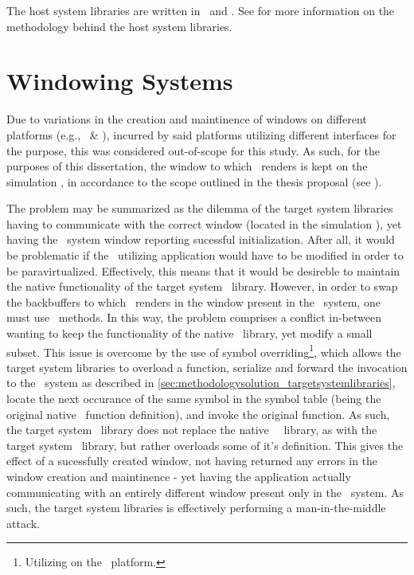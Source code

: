 The host system libraries are written in \dvttermc\ and \dvttermcplusplus .
See  for more information on the methodology behind the host system libraries.

\section{Windowing Systems}
\label{sec:methodologysolution_windowingsystems}
Due to variations in the creation and maintinence of windows on different platforms (e.g., \dvttermfedora\ \& \dvttermandroid ), incurred by said platforms utilizing different interfaces for the purpose, this was considered out-of-scope for this study.
As such, for the purposes of this dissertation, the window to which \dvttermopengl\ renders is kept on the simulation \dvttermhost , in accordance to the scope outlined in the thesis proposal (see ).

The problem may be summarized as the dilemma of the target system libraries having to communicate with the correct window (located in the simulation \dvttermhost ), yet having the \dvttermtarget\ system window reporting sucessful initialization.
After all, it would be problematic if the \dvttermopengl\ utilizing application would have to be modified in order to be paravirtualized.
Effectively, this means that it would be desireble to maintain the native functionality of the target system \dvttermegl\ library.
However, in order to swap the backbuffers to which \dvttermopengl\ renders in the window present in the \dvttermhost\ system, one must use \dvttermegl\ methods.
In this way, the problem comprises a conflict in-between wanting to keep the functionality of the native \dvttermegl\ library, yet modify a small subset. 
This issue is overcome by the use of symbol overriding\footnote{Utilizing  on the \dvttermlinux\ platform.}, which allows the target system libraries to overload a function, serialize and forward the invocation to the \dvttermhost\ system as described in \ref{sec:methodologysolution_targetsystemlibraries}, locate the next occurance of the same symbol in the symbol table (being the original native \dvttermegl\ function definition), and invoke the original function.
As such, the target system \dvttermegl\ library does not replace the native \dvttermtarget\ \dvttermegl\ library, as with the target system \dvttermopengl\ library, but rather overloads some of it's definition.
This gives the effect of a sucessfully created window, not having returned any errors in the window creation and maintinence - yet having the application actually communicating with an entirely different window present only in the \dvttermhost\ system.
As such, the target system libraries is effectively performing a man-in-the-middle attack.

